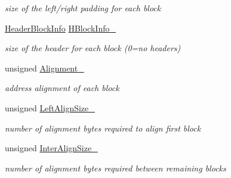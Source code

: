 \begin{DoxyCompactItemize}
\begin{DoxyCompactList}\small\item\em size of the left/right padding for each block \end{DoxyCompactList}\item 
\hypertarget{structOAConfig_a1035d7e9e4addd8b58eacc88dca876cd}{\hyperlink{structOAConfig_1_1HeaderBlockInfo}{Header\-Block\-Info} \hyperlink{structOAConfig_a1035d7e9e4addd8b58eacc88dca876cd}{H\-Block\-Info\-\_\-}}\label{structOAConfig_a1035d7e9e4addd8b58eacc88dca876cd}

\begin{DoxyCompactList}\small\item\em size of the header for each block (0=no headers) \end{DoxyCompactList}\item 
\hypertarget{structOAConfig_a633e04ed09fb16dd216d20abff4b9ffc}{unsigned \hyperlink{structOAConfig_a633e04ed09fb16dd216d20abff4b9ffc}{Alignment\-\_\-}}\label{structOAConfig_a633e04ed09fb16dd216d20abff4b9ffc}

\begin{DoxyCompactList}\small\item\em address alignment of each block \end{DoxyCompactList}\item 
\hypertarget{structOAConfig_af12cbdd25e5c6666c86e55cbcaffbdd8}{unsigned \hyperlink{structOAConfig_af12cbdd25e5c6666c86e55cbcaffbdd8}{Left\-Align\-Size\-\_\-}}\label{structOAConfig_af12cbdd25e5c6666c86e55cbcaffbdd8}

\begin{DoxyCompactList}\small\item\em number of alignment bytes required to align first block \end{DoxyCompactList}\item 
\hypertarget{structOAConfig_a5dc031628a98d0e68795a0bb68bc53ee}{unsigned \hyperlink{structOAConfig_a5dc031628a98d0e68795a0bb68bc53ee}{Inter\-Align\-Size\-\_\-}}\label{structOAConfig_a5dc031628a98d0e68795a0bb68bc53ee}

\begin{DoxyCompactList}\small\item\em number of alignment bytes required between remaining blocks \end{DoxyCompactList}\end{DoxyCompactItemize}
